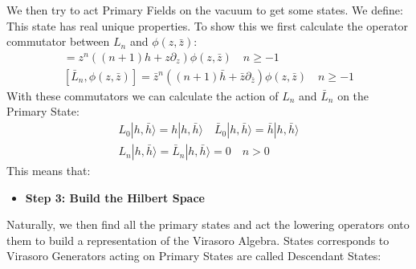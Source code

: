 We then try to act Primary Fields on the vacuum to get some states. We define:
This state has real unique properties. To show this we first
calculate the operator commutator between $ L_n $ and $ \phi(z,\bar{z}) $:
\begin{align}
  [L_n,\phi(z,\bar{z})]=z^{n}\left( (n+1)h+z\partial_z
  \right)\phi(z,\bar{z}) \quad n \geq -1\\
  [\bar{L}_n,\phi(z,\bar{z})]=\bar{z}^{n}\left(
  (n+1)\bar{h}+\bar{z}\partial_{\bar{z}} \right)\phi(z,\bar{z}) \quad n \geq -1
\end{align}
With these commutators we can calculate the action of $ L_n $ and $
\bar{L}_n $ on the Primary State:
\begin{align}
  L_0|h,\bar{h}\rangle=h|h,\bar{h}\rangle\quad\bar{L}_0|h,\bar{h}\rangle=\bar{h}|h,\bar{h}\rangle
  \\
  L_n|h,\bar{h}\rangle=\bar{L}_n|h,\bar{h}\rangle=0\quad n>0
\end{align}
This means that:

\begin{itemize}
  \item \textbf{Step 3: Build the Hilbert Space}
\end{itemize}
Naturally, we then find all the primary states and act the lowering
operators onto them to build a representation of the Virasoro Algebra.
States corresponds to Virasoro Generators acting on Primary States
are called Descendant States:

